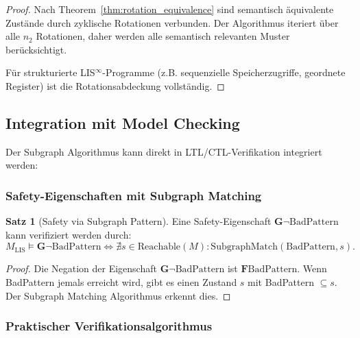 \documentclass[a4paper,12pt]{article}
\theoremstyle{definition}
\newtheorem{satz}{Satz}
\begin{document}
\begin{proof}
	Nach Theorem~\ref{thm:rotation_equivalence} sind semantisch äquivalente Zustände durch zyklische Rotationen verbunden. Der Algorithmus iteriert über alle $n_2$ Rotationen, daher werden alle semantisch relevanten Muster berücksichtigt.
	
	Für strukturierte LIS$^{\infty}$-Programme (z.B. sequenzielle Speicherzugriffe, geordnete Register) ist die Rotationsabdeckung vollständig.
\end{proof}

\subsection{Integration mit Model Checking}

Der Subgraph Algorithmus kann direkt in LTL/CTL-Verifikation integriert werden:

\subsubsection{Safety-Eigenschaften mit Subgraph Matching}

\begin{satz}[Safety via Subgraph Pattern]
	\label{satz:safety_subgraph}
	Eine Safety-Eigenschaft $\mathbf{G}\neg\text{BadPattern}$ kann verifiziert werden durch:
	\[
	M_{\text{LIS}} \models \mathbf{G}\neg\text{BadPattern} \iff \nexists s \in \text{Reachable}(M): \text{SubgraphMatch}(\text{BadPattern}, s).
	\]
\end{satz}

\begin{proof}
	Die Negation der Eigenschaft $\mathbf{G}\neg\text{BadPattern}$ ist $\mathbf{F}\text{BadPattern}$. Wenn BadPattern jemals erreicht wird, gibt es einen Zustand $s$ mit BadPattern $\subseteq s$. Der Subgraph Matching Algorithmus erkennt dies.
\end{proof}

\subsubsection{Praktischer Verifikationsalgorithmus}
\end{document}
